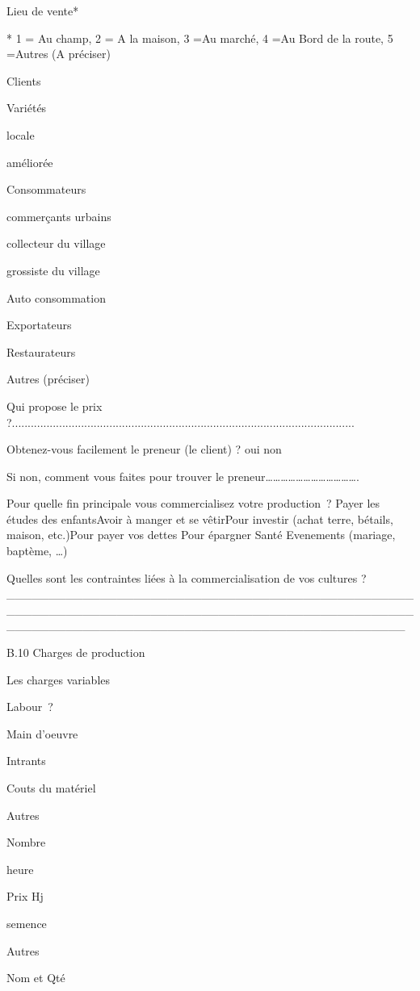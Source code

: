 \documentclass[12pt,oneside]{report}
\begin{document}
Lieu de vente*

* 1 = Au champ, 2 = A la maison, 3 =Au marché, 4 =Au Bord de la route, 5 =Autres (A préciser)

Clients

Variétés

locale

améliorée

Consommateurs

commerçants urbains

collecteur du village

grossiste du village

Auto consommation

Exportateurs

Restaurateurs

Autres (préciser)

Qui propose le prix ?.............................................................................................................

Obtenez-vous facilement le preneur (le client) ? oui     non

Si non, comment vous faites pour trouver le preneur……………………………….

Pour quelle fin principale vous commercialisez votre production ? Payer les études des enfantsAvoir à manger et se vêtirPour investir (achat terre, bétails, maison, etc.)Pour payer vos dettes   Pour épargner    Santé  Evenements (mariage, baptème, …)

Quelles sont les contraintes liées à la commercialisation de vos cultures ?\_\_\_\_\_\_\_\_\_\_\_\_\_\_\_\_\_\_\_\_\_\_\_\_\_\_\_\_\_\_\_\_\_\_\_\_\_\_\_\_\_\_\_\_\_\_\_\_\_\_\_\_\_\_\_\_\_\_\_\_\_\_\_\_\_\_\_\_\_\_\_\_\_\_\_\_\_\_\_\_\_\_\_\_\_\_\_\_\_\_\_\_\_\_\_\_\_\_\_\_\_\_\_\_\_\_\_\_\_\_\_\_\_\_\_\_\_\_\_\_\_\_\_\_\_\_\_\_\_\_\_\_\_\_\_\_\_\_\_\_\_\_\_

B.10 Charges de production

Les charges variables

Labour ?

Main d’oeuvre

Intrants

Couts du matériel

Autres

Nombre

heure

Prix Hj

semence

Autres

Nom et Qté
\end{document}
